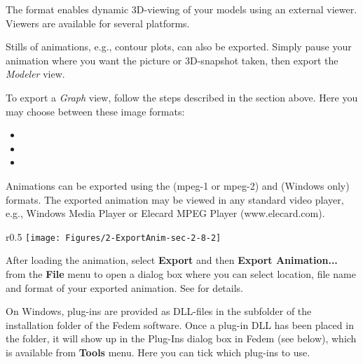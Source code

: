 The  format enables dynamic 3D-viewing of your models using
an external viewer. Viewers are available for several platforms.

Stills of animations, e.g., contour plots, can also be exported.
Simply pause your animation where you want the picture or 3D-snapshot taken,
then export the {\sl Modeler} view.



To export a {\sl Graph} view, follow the steps described in the section above.
Here you may choose between these image formats:

\begin{itemize}
\item{}
\item{}
\item{}
\end{itemize}



Animations can be exported using the  (mpeg-1 or mpeg-2) and
 (Windows only) formats. The exported animation may be viewed
in any standard video player, e.g., Windows Media Player or Elecard MPEG
Player (www.elecard.com).

\begin{wrapfigure}{r}{0.5\textwidth} \vskip-5mm
  \texttt{[image: Figures/2-ExportAnim-sec-2-8-2]}
\end {wrapfigure}

After loading the animation, \newline select \textbf{Export} and then \newline
\textbf{Export Animation...} from the \newline \textbf{File} menu
to open a dialog box \newline where you can select location, file name and format of your exported animation.
See  for details.

\clearpage



On Windows, plug-ins are provided as DLL-files in the  subfolder
of the installation folder of the Fedem software. Once a plug-in DLL has been
placed in the  folder, it will show up in the Plug-Ins dialog box
in Fedem (see below), which is available from \textbf{Tools} menu.
Here you can tick which plug-ins to use.

